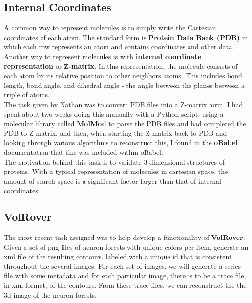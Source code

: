 \documentclass[10pt]{article}
\begin{document}
\begin{multicols}{2}
\subsection{Internal Coordinates}
\indent A common way to represent molecules is to simply write the Cartesian coordinates of each atom. The standard form is \textbf{Protein Data Bank (PDB)} in which each row represents an atom and contains coordinates and other data. Another way to represent molecules is with \textbf{internal coordinate representation} or \textbf{Z-matrix}. In this representation, the molecule consists of each atom by its relative position to other neighbors atoms. This includes bond length, bond angle, and dihedral angle - the angle between the planes between a triple of atoms. \newline \\
\indent The task given by Nathan was to convert PDB files into a Z-matrix form. I had spent about two weeks doing this manually with a Python script, using a molecular library called \textbf{MolMod} to parse the PDB files and had completed the PDB to Z-matrix, and then, when starting the Z-matrix back to PDB and looking through various algorithms to reconstruct this, I found in the \textbf{oBabel} documentation that this was included within oBabel. \newline \\
\indent The motivation behind this task is to validate 3-dimensional structures of proteins. With a typical representation of molecules in cartesian space, the amount of search space is a significant factor larger than that of internal coordinates. 
\subsection{VolRover}
\indent The most recent task assigned was to help develop a functionality of \textbf{VolRover}. Given a set of png files of neuron forests with unique colors per item, generate an xml file of the resulting contours, labeled with a unique id that is consistent throughout the several images. For each set of images, we will generate a series file with some metadata and for each particular image, there is to be a trace file, in xml format, of the contours. From these trace files, we can reconstruct the the 3d image of the neuron forests.
\end{multicols}
\end{document}
